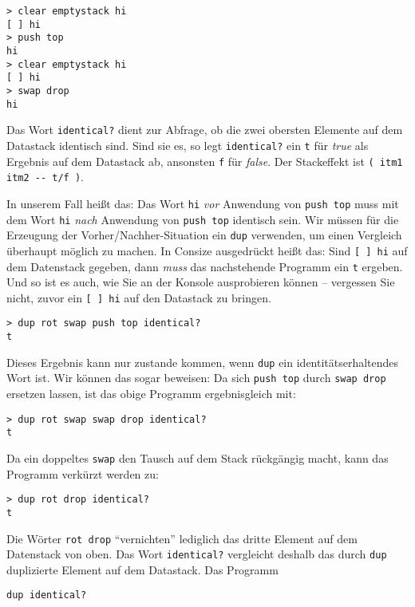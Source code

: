 \begin{verbatim}
> clear emptystack hi
[ ] hi
> push top
hi
> clear emptystack hi
[ ] hi
> swap drop
hi
\end{verbatim}

Das Wort \verb|identical?| dient zur Abfrage, ob die zwei obersten Elemente auf dem Datastack identisch sind. Sind sie es, so legt \verb|identical?| ein \verb|t| für \emph{true} als Ergebnis auf dem Datastack ab, ansonsten \verb|f| für \emph{false}. Der Stackeffekt ist \verb|( itm1 itm2 -- t/f )|.

In unserem Fall heißt das: Das Wort \verb|hi| \emph{vor} Anwendung von \verb|push top| muss mit dem Wort \verb|hi| \emph{nach} Anwendung von \verb|push top| identisch sein. Wir müssen für die Erzeugung der Vorher\slash Nachher-Situation ein \verb|dup| verwenden, um einen Vergleich überhaupt möglich zu machen. In Consize ausgedrückt heißt das: Sind \verb|[ ] hi| auf dem Datenstack gegeben, dann \emph{muss} das nachstehende Programm ein \verb|t| ergeben. Und so ist es auch, wie Sie an der Konsole ausprobieren können -- vergessen Sie nicht, zuvor ein \verb|[ ] hi| auf den Datastack zu bringen.

\begin{verbatim}
> dup rot swap push top identical?
t
\end{verbatim}

Dieses Ergebnis kann nur zustande kommen, wenn \verb|dup| ein iden\-ti\-täts\-er\-hal\-ten\-des Wort ist. Wir können das sogar beweisen: Da sich \verb|push top| durch \verb|swap drop| ersetzen lassen, ist das obige Programm ergebnisgleich mit:

\begin{verbatim}
> dup rot swap swap drop identical?
t
\end{verbatim}

Da ein doppeltes \verb|swap| den Tausch auf dem Stack rückgängig macht, kann das Programm verkürzt werden zu:

\begin{verbatim}
> dup rot drop identical?
t
\end{verbatim}

Die Wörter \verb|rot drop| "`vernichten"' lediglich das dritte Element auf dem Datenstack von oben. Das Wort \verb|identical?| vergleicht deshalb das durch \verb|dup| duplizierte Element auf dem Datastack. Das Programm

\begin{verbatim}
dup identical?
\end{verbatim}

